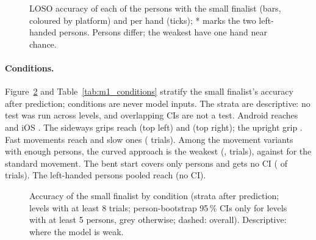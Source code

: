 \begin{figure}[tbp]
  \centering
  \caption{LOSO accuracy of each of the  persons with the small finalist (bars,
  coloured by platform) and per hand (ticks); * marks the two left-handed persons. Persons differ;
  the weakest have one hand near chance.}
  \label{fig:M1_09_per_person}
\end{figure}


\paragraph{Conditions.} Figure~\ref{fig:M1_10_conditions} and Table~\ref{tab:m1_conditions} stratify
the small finalist's accuracy after prediction; conditions are never model inputs. The strata are
descriptive: no test was run across levels, and overlapping CIs are not a test. Android reaches
 and iOS
. The sideways grips reach
 (top left) and
 (top right); the upright grip
. Fast movements reach
 and slow ones
 ( trials).
Among the movement variants with enough persons, the curved approach is the weakest
(, 
trials), against  for the standard movement. The
bent start covers only  persons and gets no
CI ( of
 trials). The
 left-handed persons pooled reach
 (no CI).

\begin{figure}[tbp]
  \centering
  \caption{Accuracy of the small finalist by condition (strata after prediction; levels with at least
  8 trials; person-bootstrap 95\,\% CIs only for levels with at least 5 persons, grey otherwise;
  dashed: overall). Descriptive: where the model is weak.}
  \label{fig:M1_10_conditions}
\end{figure}

